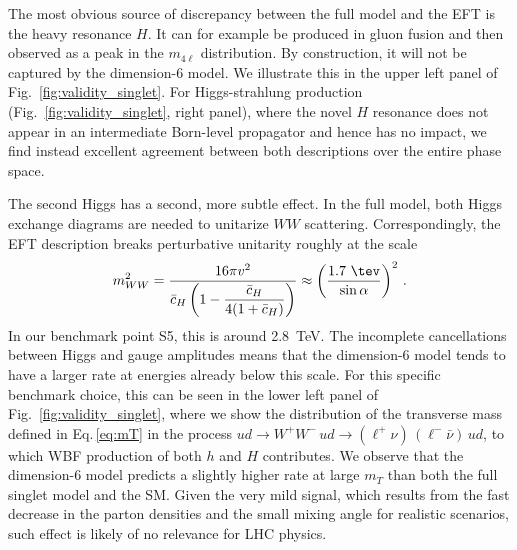 The most obvious source of discrepancy between the full model and the
EFT is the heavy resonance $H$. It can for example be produced in
gluon fusion and then observed as a peak in the $m_{4\ell}$
distribution. By construction, it will not be captured by the
dimension-6 model. We illustrate this in the upper left panel of
Fig.~\ref{fig:validity_singlet}. For Higgs-strahlung production
(Fig.~\ref{fig:validity_singlet}, right panel), where the novel $H$ resonance
does not appear in an intermediate Born-level propagator and hence has
no impact, we find instead excellent agreement between both
descriptions over the entire phase space.

The second Higgs has a second, more subtle effect.  In the full model,
both Higgs exchange diagrams are needed to unitarize $WW$
scattering. Correspondingly, the EFT description breaks perturbative
unitarity roughly at the scale~\cite{Han:2009em}
%
\begin{align} m_{WW}^2 = \frac{16 \pi v^2} {\bar{c}_H \left( 1 -
\dfrac{\bar{c}_H}{4 (1+\bar{c}_H)} \right)} \approx \left( \frac {1.7
\ \tev} {\sin \alpha} \right)^2 \,.
  \label{eq:UnitarityViolation}
\end{align}
%
In our benchmark point S5, this is around 2.8~TeV. The incomplete
cancellations between Higgs and gauge amplitudes means that the
dimension-6 model tends to have a larger rate at energies already
below this scale. For this specific benchmark choice, this can be seen
in the lower left panel of Fig.~\ref{fig:validity_singlet}, where we show the
distribution of the transverse mass defined in Eq.\,\eqref{eq:mT} in
the process $ u d \to W^+ W^- \, ud \to (\ell^+ \nu) \, (\ell^-
\bar{\nu}) \, ud$, to which WBF production of both $h$ and $H$
contributes.  We observe that the dimension-6 model predicts a
slightly higher rate at large $m_T$ than both the full singlet model
and the SM. Given the very mild signal, which results from the fast
decrease in the parton densities and the small mixing angle for
realistic scenarios, such effect is likely of no relevance for LHC
physics.\medskip

